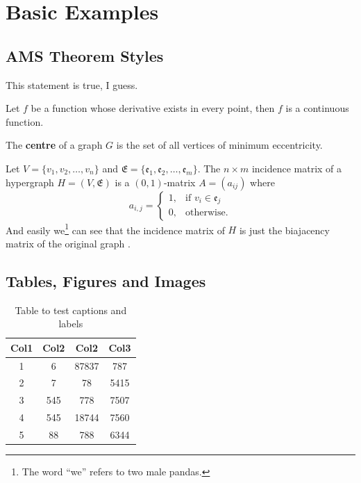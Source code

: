 
\chapter{Basic Examples}
\label{ch:ch1}

\section{AMS Theorem Styles}

\begin{remark}
	This statement is true, I guess.
\end{remark}

\begin{theorem}
	Let \(f\) be a function whose derivative exists in every point, then \(f\) is a continuous function.
\end{theorem}

\begin{definition}
	The \textbf{centre} of a graph \(G\) is the set of all vertices of minimum eccentricity.
\end{definition}

Let \(V = \{v_1, v_2, \dotsc, v_n\}\) and \(\mathfrak{E} = \{\mathfrak{e}_1, \mathfrak{e}_2, \dotsc, \mathfrak{e}_m\}\). The \(n \times m\) incidence matrix of a hypergraph \(H = (V, \mathfrak{E})\) is a \((0, 1)\)-matrix \(A = (a_{ij})\) where
\begin{equation*}
	a_{i, j} =
	\begin{cases}
		1, & \text{if \(v_i \in \mathfrak{e}_j\)} \\
		0, & \text{otherwise.}
	\end{cases}
\end{equation*}
And easily we\footnote{The word ``we'' refers to two male pandas.} can see that the incidence matrix of \(H\) is just the biajacency matrix of the original graph \cite[pp.~22]{tanenbaum2011computer}.

\section{Tables, Figures and Images}

\lipsum[1]

\begin{table}[ht]
	\centering
	\begin{tabular}{||c c c c||}
		\hline
		Col1 & Col2 & Col2 & Col3 \\ [0.5ex]
		\hline\hline
		1 & 6 & 87837\tablefootnote{This is a footnote in the table.} & 787 \\
		2 & 7 & 78 & 5415 \\
		3 & 545 & 778 & 7507 \\
		4 & 545 & 18744 & 7560 \\
		5 & 88 & 788 & 6344 \\ [1ex]
		\hline
	\end{tabular}
	\caption{Table to test captions and labels}
\end{table}

